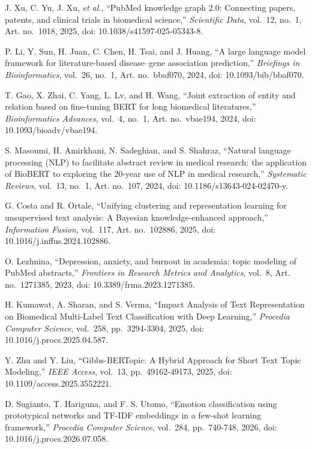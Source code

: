 J. Xu, C. Yu, J. Xu, \textit{et al.}, ``PubMed knowledge graph 2.0: Connecting papers, patents, and clinical trials in biomedical science,'' \textit{Scientific Data}, vol.~12, no.~1, Art. no.~1018, 2025, doi: 10.1038/s41597-025-05343-8.

 P. Li, Y. Sun, H. Juan, C. Chen, H. Tsai, and J. Huang, ``A large language model framework for literature-based disease–gene association prediction,'' \textit{Briefings in Bioinformatics}, vol.~26, no.~1, Art. no.~bbaf070, 2024, doi: 10.1093/bib/bbaf070.

 T. Gao, X. Zhai, C. Yang, L. Lv, and H. Wang, ``Joint extraction of entity and relation based on fine-tuning BERT for long biomedical literatures,'' \textit{Bioinformatics Advances}, vol.~4, no.~1, Art. no.~vbae194, 2024, doi: 10.1093/bioadv/vbae194.

 S. Masoumi, H. Amirkhani, N. Sadeghian, and S. Shahraz, ``Natural language processing (NLP) to facilitate abstract review in medical research: the application of BioBERT to exploring the 20-year use of NLP in medical research,'' \textit{Systematic Reviews}, vol.~13, no.~1, Art. no.~107, 2024, doi: 10.1186/s13643-024-02470-y.

 G. Costa and R. Ortale, ``Unifying clustering and representation learning for unsupervised text analysis: A Bayesian knowledge-enhanced approach,'' \textit{Information Fusion}, vol.~117, Art. no.~102886, 2025, doi: 10.1016/j.inffus.2024.102886.

 O. Lezhnina, ``Depression, anxiety, and burnout in academia: topic modeling of PubMed abstracts,'' \textit{Frontiers in Research Metrics and Analytics}, vol.~8, Art. no.~1271385, 2023, doi: 10.3389/frma.2023.1271385.

 H. Kumawat, A. Sharan, and S. Verma, ``Impact Analysis of Text Representation on Biomedical Multi-Label Text Classification with Deep Learning,'' \textit{Procedia Computer Science}, vol.~258, pp.~3294-3304, 2025, doi: 10.1016/j.procs.2025.04.587.

 Y. Zhu and Y. Liu, ``Gibbs-BERTopic: A Hybrid Approach for Short Text Topic Modeling,'' \textit{IEEE Access}, vol.~13, pp.~49162-49173, 2025, doi: 10.1109/access.2025.3552221.

 D. Sugianto, T. Hariguna, and F. S. Utomo, ``Emotion classification using prototypical networks and TF-IDF embeddings in a few-shot learning framework,'' \textit{Procedia Computer Science}, vol.~284, pp.~740-748, 2026, doi: 10.1016/j.procs.2026.07.058.

